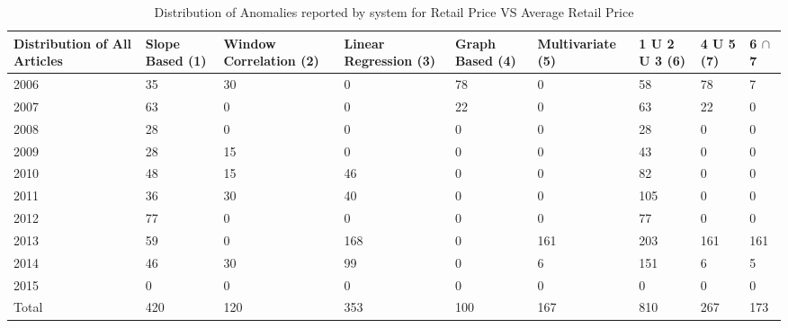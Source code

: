 \documentclass[a4paper,10pt]{report}
\begin{document}
	
	\begin{table}[]
	\centering
	\resizebox{\textwidth}{!}
	{\begin{tabular}{|l|l|l|l|l|l|l|l|l|}
	\hline
	Distribution of All Articles & Slope Based (1) & Window Correlation (2) & Linear Regression (3) & Graph Based (4) & Multivariate (5) & 1 U 2 U 3 (6) & 4 U 5 (7) & 6  $\cap$ 7 \\
	\hline
	2006                         & 35          & 30          & 0                 & 78          & 0             & 58        & 78    & 7                                     \\
	\hline
	2007                         & 63          & 0           & 0                 & 22          & 0             & 63        & 22    & 0                                     \\
	\hline
	2008                         & 28          & 0           & 0                 & 0           & 0             & 28        & 0     & 0                                     \\
	\hline
	2009                         & 28          & 15          & 0                 & 0           & 0             & 43        & 0     & 0                                     \\
	\hline
	2010                         & 48          & 15          & 46                & 0           & 0             & 82        & 0     & 0                                     \\
	\hline
	2011                         & 36          & 30          & 40                & 0           & 0             & 105       & 0     & 0                                     \\
	\hline
	2012                         & 77          & 0           & 0                 & 0           & 0             & 77        & 0     & 0                                     \\
	\hline
	2013                         & 59          & 0           & 168               & 0           & 161           & 203       & 161   & 161                                   \\
	\hline
	2014                         & 46          & 30          & 99                & 0           & 6             & 151       & 6     & 5                                     \\
	\hline
	2015                         & 0           & 0           & 0                 & 0           & 0             & 0         & 0     & 0                                     \\
	\hline
	Total			    & 420         & 120         & 353               & 100         & 167           & 810       & 267   & 173                                   \\
	\hline
	\end{tabular}}
	\caption{Distribution of Anomalies reported by system for Retail Price VS Average Retail Price}
	\label{RetailVsAverageDist}
	\end{table}
	  
\end{document}
